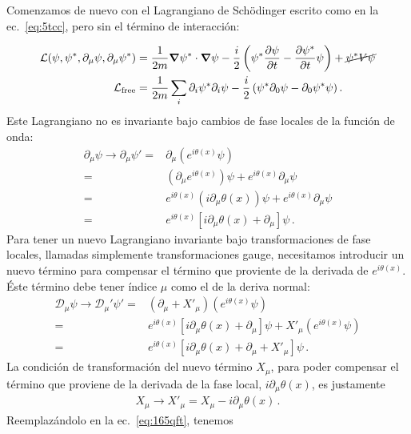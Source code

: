 \begin{subappendices}
Comenzamos de nuevo con el Lagrangiano de Schödinger escrito como en la ec.~\eqref{eq:5tcc}, pero sin el término de interacción:

\begin{align}
  \mathcal{L}(\psi,\psi^*,\partial_\mu\psi,\partial_\mu\psi^*)&=\frac{1}{2m}\boldsymbol{\nabla}\psi^*\cdot\boldsymbol{\nabla}\psi-\frac{i}{2}
  \left(
\psi^*\frac{\partial\psi}{\partial t}-\frac{\partial\psi^*}{\partial t}\psi
  \right)+\cancel{\psi^*V\psi}\\
\mathcal{L}_{\text{free}}&=\frac{1}{2m}\sum_i\partial_i\psi^*\partial_i\psi-\frac{i}{2}
  \left(\psi^*\partial_0\psi-\partial_0\psi^*\psi\right).\nonumber
\end{align}
Este Lagrangiano no es invariante bajo cambios de fase locales de la función de onda:
\begin{align}
  \partial_\mu \psi\to\partial_\mu \psi'=&\partial_\mu \left(e^{i\theta(x)}\psi\right)\nonumber\\
  =&\left(\partial_\mu e^{i\theta(x)}\right)\psi+e^{i\theta(x)}\partial_\mu\psi\nonumber\\
  =&e^{i\theta(x)}\left(i\partial_\mu \theta(x)\right)\psi+e^{i\theta(x)}\partial_\mu\psi\nonumber\\
  =&e^{i\theta(x)}\left[i\partial_\mu \theta(x)+\partial_\mu\right]\psi\,.
\end{align}
Para tener un nuevo Lagrangiano invariante bajo transformaciones de fase locales, llamadas simplemente transformaciones gauge, necesitamos introducir un nuevo término para compensar el término que proviente de la derivada de  $e^{i\theta(x)}$. Éste término debe tener índice $\mu$ como el de la deriva normal:
\begin{align}
\label{eq:165qft}
   \mathcal{D}_\mu \psi\to\mathcal{D}_\mu' \psi'=&(\partial_\mu+X'_\mu) \left(e^{i\theta(x)}\psi\right)\nonumber\\
   =&e^{i\theta(x)}\left[i\partial_\mu \theta(x)+\partial_\mu\right]\psi+X'_\mu \left(e^{i\theta(x)}\psi\right)\nonumber\\
   =&e^{i\theta(x)}\left[i\partial_\mu \theta(x)+\partial_\mu+X'_\mu \right]\psi\,.
\end{align}
La condición de transformación del nuevo término $X_\mu$, para poder compensar el término que proviene de la derivada de la fase local,  $i\partial_\mu\theta(x)$, es justamente
\begin{align}
\label{eq:169qft}
X_\mu\to  X'_\mu=X_\mu-i\partial_\mu\theta(x)\,.
\end{align}
Reemplazándolo en la ec.~\eqref{eq:165qft}, tenemos

\end{subappendices}
